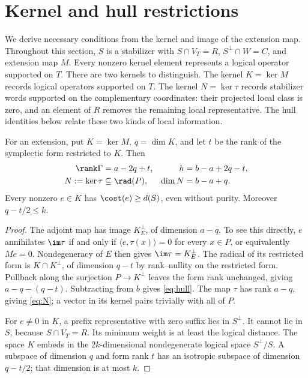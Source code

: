 \section{Kernel and hull restrictions}\label{sec:restrictions}

We derive necessary conditions from the kernel and image of the extension
map. Throughout this section, \(S\) is a stabilizer with
\(S\cap V_T=R\), \(S^\perp\cap W=C\), and extension map \(M\).
Every nonzero kernel element represents a logical operator supported on
\(T\).
There are two kernels to distinguish. The kernel \(K=\ker M\) records
logical operators supported on \(T\). The kernel \(N=\ker\tau\)
records stabilizer words supported on the complementary coordinates:
their projected local class is zero, and an element of \(R\) removes
the remaining local representative. The hull identities below relate
these two kinds of local information.

\begin{proposition}\label{prop:kernel}
For an extension, put \(K=\ker M\), \(q=\dim K\), and let \(t\) be the
rank of the symplectic form restricted to \(K\). Then
\begin{align}
 \rank\Gamma&=a-2q+t,&
 h&=b-a+2q-t,\label{eq:hull}\\
 N:=\ker\tau&\subseteq\rad(P),&
 \dim N&=b-a+q.\label{eq:N}
\end{align}
Every nonzero \(e\in K\) has \(\cost(e)\geq d(S)\), even without
purity. Moreover \(q-t/2\leq k\).
\end{proposition}
\begin{proof}
The adjoint map has image \(K^\perp_E\), of dimension \(a-q\).
To see this directly, \(e\) annihilates \(\im\tau\) if and only
if \(\langle e,\tau(x)\rangle=0\) for every \(x\in P\), or
equivalently \(Me=0\). Nondegeneracy of \(E\) then gives
\(\im\tau=K^\perp_E\).
The radical of its restricted form is \(K\cap K^\perp\), of dimension
\(q-t\) by rank--nullity on the restricted form. Pullback along the surjection \(P\to K^\perp\) leaves
the form rank unchanged, giving \(a-q-(q-t)\). Subtracting from \(b\)
gives \eqref{eq:hull}. The map \(\tau\) has rank \(a-q\), giving
\eqref{eq:N}; a vector in its kernel pairs trivially with all of \(P\).

For \(e\ne0\) in \(K\), a prefix representative with zero suffix lies
in \(S^\perp\). It cannot lie in \(S\), because \(S\cap V_T=R\).
Its minimum weight is at least the logical distance. The space
\(K\) embeds in the \(2k\)-dimensional nondegenerate logical space
\(S^\perp/S\). A subspace of dimension \(q\) and form rank \(t\)
has an isotropic subspace of dimension \(q-t/2\); that dimension is at
most \(k\).
\end{proof}

